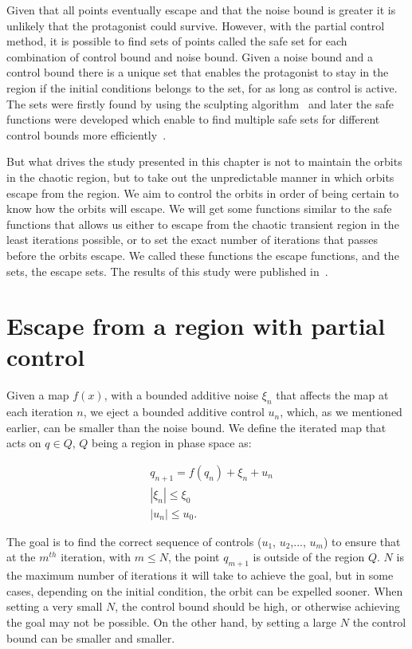 Given that all points eventually escape and that the noise bound is greater it is unlikely that the protagonist could survive. However, with the partial control method, it is possible to find sets of points called the safe set for each combination of control bound and noise bound. Given a noise bound and a control bound there is a unique set that enables the protagonist to stay in the region if the initial conditions belongs to the set, for as long as control is active. The sets were firstly found by using the sculpting algorithm~\cite{Sculpting} and later the safe functions were developed which enable to find multiple safe sets for different control bounds more efficiently~\cite{SafeSets}.

But what drives the study presented in this chapter is not to maintain the orbits in the chaotic region, but to take out the unpredictable manner in which orbits escape from the region. We aim to control the orbits in order of being certain to know how the orbits will escape. We will get some functions similar to the safe functions that allows us either to escape from the chaotic transient region in the least iterations possible, or to set the exact number of iterations that passes before the orbits escape. We called these functions the escape functions, and the sets, the escape sets. The results of this study were published in~\cite{Alfaro2021}.
 
\section{Escape from a region with partial control}

Given a map $f(x)$, with a bounded additive noise $\xi_n$ that affects the map at each iteration $n$, we eject a bounded additive control $u_n$, which, as we mentioned earlier, can be smaller than the noise bound. We define the iterated map that acts on $q\in Q$, $Q$ being a region in phase space as:

\begin{equation}
\begin{split}
&q_{n+1}=f(q_n)+\xi_n+u_n \\
&|\xi_n|\leq \xi_0 \\
&|u_n|\leq u_0.
\end{split}
\end{equation}

The goal is to find the correct sequence of controls ($u_1$, $u_2$,..., $u_m$) to ensure that at the $m^{th}$ iteration, with $m \leq N$, the point $q_{m+1}$ is outside of the region $Q$. $N$ is the maximum number of iterations it will take to achieve the goal, but in some cases, depending on the initial condition, the orbit can be expelled sooner. When setting a very small $N$, the control bound should be high, or otherwise achieving the goal may not be possible. On the other hand, by setting a large $N$ the control bound can be smaller and smaller.


